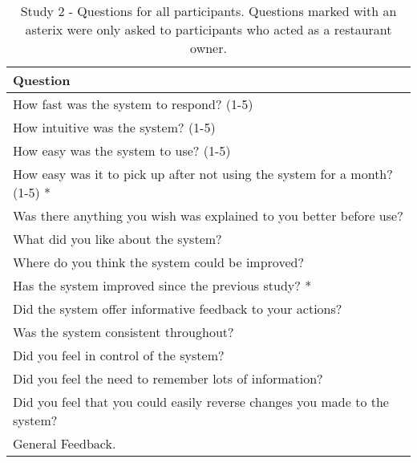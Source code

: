 \begin{table}[h]
    \centering
    \captionsetup{justification=centering}
    \begin{tabular}{ |p{\textwidth}| }
    \hline
    \textbf{Question}\\
    \hline
    How fast was the system to respond? (1-5) \\
    \hline
    How intuitive was the system? (1-5) \\
    \hline
    How easy was the system to use? (1-5) \\
    \hline
    How easy was it to pick up after not using the system for a month? (1-5) * \\
    \hline
    Was there anything you wish was explained to you better before use? \\
    \hline
    What did you like about the system? \\
    \hline
    Where do you think the system could be improved? \\
    \hline
    Has the system improved since the previous study? * \\
    \hline
    Did the system offer informative feedback to your actions? \\
    \hline
    Was the system consistent throughout? \\
    \hline
    Did you feel in control of the system? \\
    \hline
    Did you feel the need to remember lots of information? \\
    \hline
    Did you feel that you could easily reverse changes you made to the system? \\
    \hline
    General Feedback. \\
    \hline
    \end{tabular}
    \caption[Study 2 - Questions for all participants]{Study 2 - Questions for all participants. Questions marked with an asterix were only asked to participants who acted as a restaurant owner.}
    \label{tab:Study2Questions}
\end{table}


